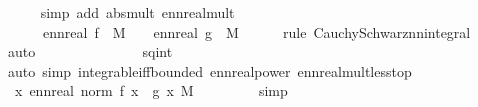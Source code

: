 \begin{isabellebody}
\ \ \ \ \isamarkupfalse%
\ {\isacharparenleft}{\kern0pt}simp\ add{\isacharcolon}{\kern0pt}\ abs{\isacharunderscore}{\kern0pt}mult\ ennreal{\isacharunderscore}{\kern0pt}mult{\isacharparenright}{\kern0pt}\isanewline
\ \ \isamarkupfalse%
\ \isamarkupfalse%
\ {\isachardoublequoteopen}{\isachardot}{\kern0pt}{\isachardot}{\kern0pt}{\isachardot}{\kern0pt}\ {\isasymle}\ \ {\isacharparenleft}{\kern0pt}{\isasymintegral}\isactrlsup {\isacharplus}{\kern0pt}\ {\isasymomega}{\isachardot}{\kern0pt}\ ennreal\ {\isasymbar}f\ {\isasymomega}{\isasymbar}{\isacharcircum}{\kern0pt}{}\ {\isasympartial}M{\isacharparenright}{\kern0pt}\ {\isacharasterisk}{\kern0pt}\ {\isacharparenleft}{\kern0pt}{\isasymintegral}\isactrlsup {\isacharplus}{\kern0pt}\ {\isasymomega}{\isachardot}{\kern0pt}\ ennreal\ {\isasymbar}g\ {\isasymomega}{\isasymbar}{\isacharcircum}{\kern0pt}{}\ {\isasympartial}M{\isacharparenright}{\kern0pt}{\isachardoublequoteclose}\isanewline
\ \ \ \ \isamarkupfalse%
\ {\isacharparenleft}{\kern0pt}rule\ Cauchy{\isacharunderscore}{\kern0pt}Schwarz{\isacharunderscore}{\kern0pt}nn{\isacharunderscore}{\kern0pt}integral{\isacharparenright}{\kern0pt}\ \isamarkupfalse%
\ auto\isanewline
\ \ \isamarkupfalse%
\ \isamarkupfalse%
\ {\isachardoublequoteopen}{\isachardot}{\kern0pt}{\isachardot}{\kern0pt}{\isachardot}{\kern0pt}\ {\isacharless}{\kern0pt}\ {\isasyminfinity}{\isachardoublequoteclose}\ \isanewline
\ \ \ \ \isamarkupfalse%
\ sq{\isacharunderscore}{\kern0pt}int\ \isamarkupfalse%
\ {\isacharparenleft}{\kern0pt}auto\ simp{\isacharcolon}{\kern0pt}\ integrable{\isacharunderscore}{\kern0pt}iff{\isacharunderscore}{\kern0pt}bounded\ ennreal{\isacharunderscore}{\kern0pt}power\ ennreal{\isacharunderscore}{\kern0pt}mult{\isacharunderscore}{\kern0pt}less{\isacharunderscore}{\kern0pt}top{\isacharparenright}{\kern0pt}\isanewline
\ \ \isamarkupfalse%
\ \isamarkupfalse%
\ {\isachardoublequoteopen}{\isacharparenleft}{\kern0pt}{\isasymintegral}\isactrlsup {\isacharplus}{\kern0pt}\ x{\isachardot}{\kern0pt}\ ennreal\ {\isacharparenleft}{\kern0pt}norm\ {\isacharparenleft}{\kern0pt}f\ x\ {\isacharasterisk}{\kern0pt}\ g\ x{\isacharparenright}{\kern0pt}{\isacharparenright}{\kern0pt}\ {\isasympartial}M{\isacharparenright}{\kern0pt}\ {\isacharless}{\kern0pt}\ {\isasyminfinity}{\isachardoublequoteclose}\ \isanewline
\ \ \ \ \isamarkupfalse%
\ simp\isanewline

\end{isabellebody}
